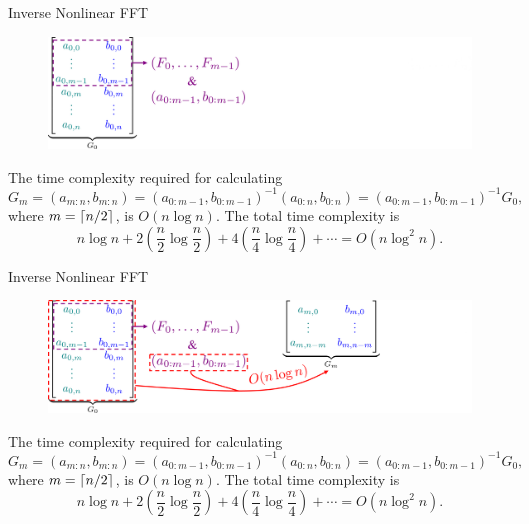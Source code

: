 \begin{frame}{Inverse Nonlinear FFT}
    \vspace{0.3cm}
    \begin{figure}
        \centering
        \includegraphics[height=0.24\textwidth]{figures/iNLFFT2.png}
    \end{figure}
    
    \color{white}The time complexity required for calculating
    \begin{equation*}
        G_m = (a_{m:n},b_{m:n}) = (a_{0:m-1},b_{0:m-1})^{-1} (a_{0:n},b_{0:n}) = (a_{0:m-1},b_{0:m-1})^{-1} G_0,
    \end{equation*}
    where $m=\left\lceil{n/2}\right\rceil$, is $O(n\log n)$. The total time complexity is
    \begin{equation}
        n\log n + 2\left(\frac{n}{2}\log\frac{n}{2}\right) + 4\left(\frac{n}{4}\log\frac{n}{4}\right) + \cdots = O(n\log^2n).
    \end{equation}
\end{frame}
\addtocounter{framenumber}{-1}
\begin{frame}{Inverse Nonlinear FFT}
    \vspace{0.3cm}
    \begin{figure}
        \centering
        \includegraphics[height=0.24\textwidth]{figures/iNLFFT3.png}
    \end{figure}
    
    The time complexity required for calculating
    \begin{equation*}
        G_m = (a_{m:n},b_{m:n}) = (a_{0:m-1},b_{0:m-1})^{-1} (a_{0:n},b_{0:n}) = (a_{0:m-1},b_{0:m-1})^{-1} G_0,
    \end{equation*}
    where $m=\left\lceil{n/2}\right\rceil$, is $O(n\log n)$. \color{white}The total time complexity is
    \begin{equation}
        n\log n + 2\left(\frac{n}{2}\log\frac{n}{2}\right) + 4\left(\frac{n}{4}\log\frac{n}{4}\right) + \cdots = O(n\log^2n).
    \end{equation}
\end{frame}

